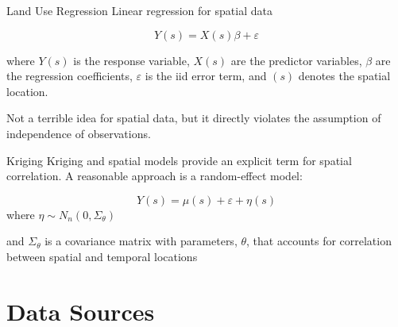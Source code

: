 \documentclass[
  ignorenonframetext,
]{beamer}
\begin{document}
\begin{frame}{Land Use Regression}
\label{land-use-regression}
Linear regression for spatial data

\[
Y(s) =  X(s)\beta + \varepsilon
\]

where \(Y(s)\) is the response variable, \(X(s)\) are the predictor
variables, \(\beta\) are the regression coefficients, \(\varepsilon\) is
the iid error term, and \((s)\) denotes the spatial location.

Not a terrible idea for spatial data, but it directly violates the
assumption of independence of observations.
\end{frame}

\begin{frame}{Kriging}
\label{kriging}
Kriging and spatial models provide an explicit term for spatial
correlation. A reasonable approach is a random-effect model:

\[
Y(s) = \mu(s) + \varepsilon +  \eta(s)
\] where \(\eta \sim N_n(0,\Sigma_{\theta})\)

and \(\Sigma_{\theta}\) is a covariance matrix with parameters,
\(\theta\), that accounts for correlation between spatial and temporal
locations
\end{frame}

\section{Data Sources}\label{data-sources}
\end{document}
